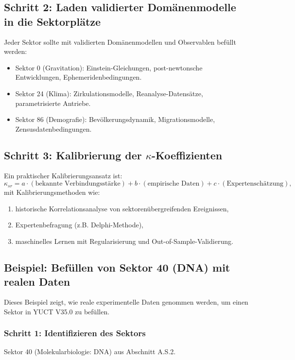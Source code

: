 \documentclass[13pt,a4paper]{article}
\begin{document}
	\subsection*{Schritt 2: Laden validierter Domänenmodelle in die Sektorplätze}
	Jeder Sektor sollte mit validierten Domänenmodellen und Observablen befüllt werden:
	\begin{itemize}[leftmargin=*]
		\item Sektor 0 (Gravitation): Einstein-Gleichungen, post-newtonsche Entwicklungen, Ephemeridenbedingungen.
		\item Sektor 24 (Klima): Zirkulationsmodelle, Reanalyse-Datensätze, parametrisierte Antriebe.
		\item Sektor 86 (Demografie): Bevölkerungsdynamik, Migrationsmodelle, Zensusdatenbedingungen.
	\end{itemize}
	
	\subsection*{Schritt 3: Kalibrierung der $\kappa$-Koeffizienten}
	Ein praktischer Kalibrierungsansatz ist:
	\[ \kappa_{sr} = a\cdot (\text{bekannte Verbindungsstärke}) + b\cdot (\text{empirische Daten}) + c\cdot (\text{Expertenschätzung}), \]
	mit Kalibrierungsmethoden wie:
	\begin{enumerate}[leftmargin=*]
		\item historische Korrelationsanalyse von sektorenübergreifenden Ereignissen,
		\item Expertenbefragung (z.B. Delphi-Methode),
		\item maschinelles Lernen mit Regularisierung und Out-of-Sample-Validierung.
	\end{enumerate}
	
	\subsection*{Beispiel: Befüllen von Sektor 40 (DNA) mit realen Daten}
	
	Dieses Beispiel zeigt, wie reale experimentelle Daten genommen werden, um einen Sektor in YUCT V35.0 zu befüllen.
	
	\subsubsection*{Schritt 1: Identifizieren des Sektors}
	Sektor 40 (Molekularbiologie: DNA) aus Abschnitt A.S.2.
	
\end{document}
